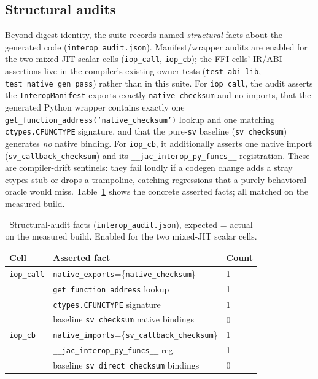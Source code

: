 \documentclass[conference]{IEEEtran}
\newcommand{\code}[1]{\texttt{#1}}
\begin{document}
\subsection{Structural audits}
\label{sec:audit}

Beyond digest identity, the suite records named \emph{structural} facts about the
generated code (\code{interop\_audit.json}). Manifest/wrapper audits are enabled
for the two mixed-JIT scalar cells (\code{iop\_call}, \code{iop\_cb}); the FFI
cells' IR/ABI assertions live in the compiler's existing owner tests
(\code{test\_abi\_lib}, \code{test\_native\_gen\_pass}) rather than in this
suite. For \code{iop\_call}, the audit
asserts the \code{InteropManifest} exports exactly \code{native\_checksum} and no
imports, that the generated Python wrapper contains exactly one
\code{get\_function\_address('native\_checksum')} lookup and one matching
\code{ctypes.CFUNCTYPE} signature, and that the pure-\code{sv} baseline
(\code{sv\_checksum}) generates \emph{no} native binding. For \code{iop\_cb}, it
additionally asserts one native import (\code{sv\_callback\_checksum}) and its
\code{\_\_jac\_interop\_py\_funcs\_\_} registration. These are compiler-drift
sentinels: they fail loudly if a codegen change adds a stray ctypes stub or
drops a trampoline, catching regressions that a purely behavioral oracle would
miss. Table~\ref{tab:audit} shows the concrete asserted facts; all matched on the
measured build.

\begin{table}[t]
\caption{Structural-audit facts (\code{interop\_audit.json}), expected =
actual on the measured build. Enabled for the two mixed-JIT scalar cells.}
\label{tab:audit}
\centering
\footnotesize
\setlength{\tabcolsep}{4pt}
\begin{tabular}{@{}lll@{}}
\toprule
Cell & Asserted fact & Count \\
\midrule
\code{iop\_call} & \code{native\_exports}=\{\code{native\_checksum}\} & 1 \\
                 & \code{get\_function\_address} lookup & 1 \\
                 & \code{ctypes.CFUNCTYPE} signature & 1 \\
                 & baseline \code{sv\_checksum} native bindings & 0 \\
\midrule
\code{iop\_cb}   & \code{native\_imports}=\{\code{sv\_callback\_checksum}\} & 1 \\
                 & \code{\_\_jac\_interop\_py\_funcs\_\_} reg. & 1 \\
                 & baseline \code{sv\_direct\_checksum} bindings & 0 \\
\bottomrule
\end{tabular}
\end{table}
\end{document}
